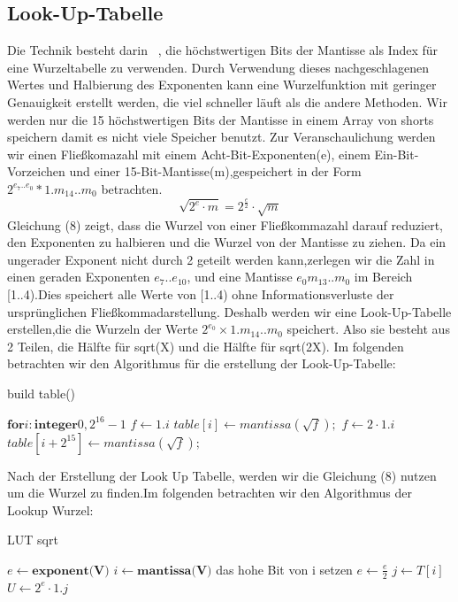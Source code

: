 \documentclass[course=erap]{aspdoc}
\begin{document}
\subsection{Look-Up-Tabelle}
Die Technik besteht darin ~\cite{lut}, die höchstwertigen Bits der Mantisse
als Index für eine Wurzeltabelle zu verwenden. Durch Verwendung dieses nachgeschlagenen Wertes und
Halbierung des Exponenten kann eine Wurzelfunktion mit geringer Genauigkeit erstellt werden, die viel schneller läuft als die andere Methoden.
Wir werden nur die 15 höchstwertigen Bits der Mantisse in einem Array von shorts speichern damit es nicht viele Speicher benutzt.
Zur Veranschaulichung werden wir einen Fließkomazahl mit einem Acht-Bit-Exponenten(e), einem Ein-Bit-Vorzeichen und einer 15-Bit-Mantisse(m),gespeichert in der Form $2^{e_7..e_0} * 1.m_{14}..m_0$ betrachten.
\begin{equation} \label{eq9}
    \sqrt{2^{e}\cdot{m}}=2^{\frac{e}{2}}\cdot{\sqrt{m}}
\end{equation}
Gleichung (8) zeigt, dass die Wurzel von einer
Fließkommazahl darauf reduziert, den Exponenten zu halbieren und die Wurzel von der Mantisse zu ziehen.
Da ein ungerader Exponent nicht durch 2 geteilt werden kann,zerlegen wir die Zahl in einen geraden Exponenten $e_7..e_10$, und eine Mantisse $e_0m_{13}..m_0$ im Bereich [1..4).Dies speichert alle Werte von [1..4) ohne Informationsverluste
der ursprünglichen Fließkommadarstellung.
Deshalb werden wir eine Look-Up-Tabelle erstellen,die die Wurzeln der Werte $2^{e_0} \times 1.m_{14}..m_0$ speichert. Also sie besteht aus 2 Teilen, die Hälfte für sqrt(X) und die Hälfte für sqrt(2X). Im folgenden betrachten wir
den Algorithmus für die erstellung der Look-Up-Tabelle:
\begin{algorithm}[hbt!]
    \caption{build table()}\label{alg:cap1}
    \begin{algorithmic}
        \State $\textbf{for}  i: \textbf{integer}  0,2^{16}-1$
        \State $f \gets 1.i$
        \State $table[i] \gets mantissa(\sqrt{f});$
        \State $f \gets 2\cdot1.i$
        \State $table[i+2^{15}] \gets mantissa(\sqrt{f});$

    \end{algorithmic}
\end{algorithm}

Nach der Erstellung der Look Up Tabelle, werden wir die Gleichung (8) nutzen um die Wurzel zu finden.Im folgenden betrachten wir
den Algorithmus der Lookup Wurzel:


\begin{algorithm}[hbt!]
    \caption{LUT sqrt}\label{alg:cap2}
    \begin{algorithmic}
        \State $e \gets \textbf{exponent(V)}$
        \State $i \gets \textbf{mantissa(V)}$
          
        \State das hohe Bit von i setzen
        \EndIf
        \State $e \gets \frac{e}{2}$  
        \State $j \gets T[i] $
        \State  $U \gets 2^e \cdot 1.j  $


    \end{algorithmic}
\end{algorithm}
\end{document}
